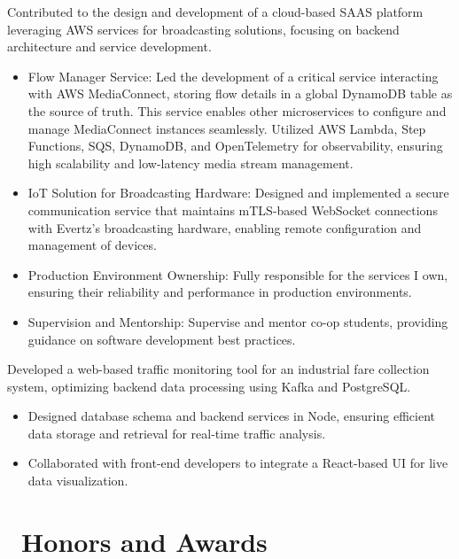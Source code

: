 \documentclass{resume}
\begin{document}
 {Contributed to the design and development of a cloud-based SAAS platform leveraging AWS services for broadcasting solutions, focusing on backend architecture and service development.}
\begin{itemize}
  \item Flow Manager Service: Led the development of a critical service interacting with AWS MediaConnect, storing flow details in a global DynamoDB table as the source of truth. This service enables other microservices to configure and manage MediaConnect instances seamlessly. Utilized AWS Lambda, Step Functions, SQS, DynamoDB, and OpenTelemetry for observability, ensuring high scalability and low-latency media stream management. 
  \item IoT Solution for Broadcasting Hardware: Designed and implemented a secure communication service that maintains mTLS-based WebSocket connections with Evertz’s broadcasting hardware, enabling remote configuration and management of devices.
  \item Production Environment Ownership: Fully responsible for the services I own, ensuring their reliability and performance in production environments.
  \item Supervision and Mentorship: Supervise and mentor co-op students, providing guidance on software development best practices.
\end{itemize}


Developed a web-based traffic monitoring tool for an industrial fare collection system, optimizing backend data processing using Kafka and PostgreSQL.
\begin{itemize}
  \item Designed database schema and backend services in Node, ensuring efficient data storage and retrieval for real-time traffic analysis.
  \item Collaborated with front-end developers to integrate a React-based UI for live data visualization.
\end{itemize}

\section{\faHeartO\ Honors and Awards}

%
%
\end{document}
